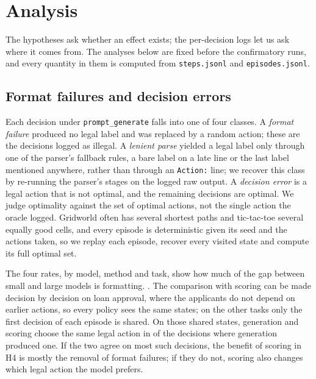 \section{Analysis}
\label{sec:analysis}

The hypotheses ask whether an effect exists; the per-decision logs let us ask where it comes from. The analyses below are fixed before the confirmatory runs, and every quantity in them is computed from \texttt{steps.jsonl} and \texttt{episodes.jsonl}.

\subsection{Format failures and decision errors}
\label{sec:analysis:errors}

Each decision under \texttt{prompt\_generate} falls into one of four classes. A \emph{format failure} produced no legal label and was replaced by a random action; these are the decisions logged as illegal. A \emph{lenient parse} yielded a legal label only through one of the parser's fallback rules, a bare label on a late line or the last label mentioned anywhere, rather than through an \texttt{Action:} line; we recover this class by re-running the parser's stages on the logged raw output. A \emph{decision error} is a legal action that is not optimal, and the remaining decisions are optimal. We judge optimality against the set of optimal actions, not the single action the oracle logged. Gridworld often has several shortest paths and tic-tac-toe several equally good cells, and every episode is deterministic given its seed and the actions taken, so we replay each episode, recover every visited state and compute its full optimal set.

The four rates, by model, method and task, show how much of the gap between small and large models is formatting. . The comparison with scoring can be made decision by decision on loan approval, where the applicants do not depend on earlier actions, so every policy sees the same states; on the other tasks only the first decision of each episode is shared. On those shared states, generation and scoring choose the same legal action in  of the decisions where generation produced one. If the two agree on most such decisions, the benefit of scoring in H4 is mostly the removal of format failures; if they do not, scoring also changes which legal action the model prefers.

